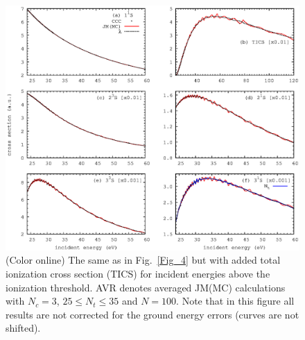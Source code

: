 \documentclass[aip
, pra
, showpacs
, aps
, twocolumn
, groupedaddress
, floatfix
]{revtex4}
\begin{document}
\begin{figure}[htb]
\includegraphics[scale=1]{fig5.ps}
\caption{(Color online)
The same as in Fig.~\ref{Fig_4} but with added total ionization cross section (TICS)
for incident energies above the ionization threshold.
AVR denotes averaged JM(MC) calculations with $N_c=3$, $25\leq N_t \le 35$ and $N=100$.
Note that in this figure all results are not corrected for the ground energy errors (curves are not shifted).
}
\label{Fig_5}
\end{figure}
\end{document}
